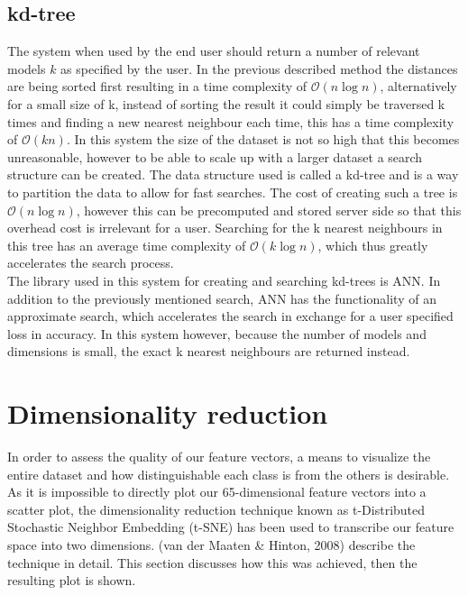 \documentclass{bigdata}
\begin{document}
\subsection{kd-tree}
The system when used by the end user should return a number of relevant models $k$ as specified by the user. In the previous described method the distances are being sorted first resulting in a time complexity of $\mathcal{O}(n\log{}n)$, alternatively for a small size of k, instead of sorting the result it could simply be traversed k times and finding a new nearest neighbour each time, this has a time complexity of $\mathcal{O}(kn)$. In this system the size of the dataset is not so high that this becomes unreasonable, however to be able to scale up with a larger dataset a search structure can be created. The data structure used is called a kd-tree and is a way to partition the data to allow for fast searches. The cost of creating such a tree is $\mathcal{O}(n\log{}n)$, however this can be precomputed and stored server side so that this overhead cost is irrelevant for a user. Searching for the k nearest neighbours in this tree has an average time complexity of $\mathcal{O}(k\log{}n)$, which thus greatly accelerates the search process. \\
The library used in this system for creating and searching kd-trees is ANN. In addition to the previously mentioned search, ANN has the functionality of an approximate search, which accelerates the search in exchange for a user specified loss in accuracy. In this system however, because the number of models and dimensions is small, the exact k nearest neighbours are returned instead. 

\section{Dimensionality reduction}
In order to assess the quality of our feature vectors, a means to visualize the entire dataset and how distinguishable each class is from the others is desirable. As it is impossible to directly plot our 65-dimensional feature vectors into a scatter plot, the dimensionality reduction technique known as t-Distributed Stochastic Neighbor Embedding (t-SNE) has been used to transcribe our feature space into two dimensions. (van der Maaten \& Hinton, 2008) describe the technique in detail. This section discusses how this was achieved, then the resulting plot is shown. 
\end{document}
